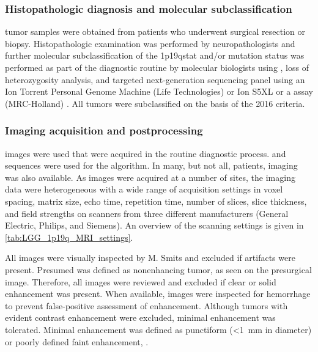 \subsubsection{Histopathologic diagnosis and molecular subclassification}

\Gls{tumor} samples were obtained from patients who underwent surgical resection or biopsy.
Histopathologic examination was performed by neuropathologists and further molecular subclassification of the \acl{1p19qstat} and/or  mutation status was performed as part of the diagnostic routine by molecular biologists using , loss of heterozygosity analysis, and targeted next-generation sequencing panel using an Ion Torrent Personal Genome Machine (Life Technologies) or Ion S5XL or a  assay (MRC-Holland) \autocite{dubbink2015molecular, dubbink2016diagnostic, riemenschneider2010molecular, bienkowski2018molecular}.
All \glspl{tumor} were subclassified on the basis of the  2016 criteria.

\subsubsection{Imaging acquisition and postprocessing}

 images were used that were acquired in the routine diagnostic process.
 and   sequences were used for the algorithm.
In many, but not all, patients,  imaging was also available.
As images were acquired at a number of sites, the imaging data were heterogeneous with a wide range of acquisition settings in voxel spacing, matrix size, echo time, repetition time, number of slices, slice thickness, and field strengths on scanners from three different manufacturers (General Electric, Philips, and Siemens).
An overview of the scanning settings is given in \cref{tab:LGG_1p19q_MRI_settings}.

All images were visually inspected by M. Smits and excluded if  artifacts were present.
Presumed  was defined as nonenhancing \gls{tumor}, as seen on the presurgical   image.
Therefore, all  images were reviewed and excluded if clear or solid enhancement was present.
When available,  images were inspected for hemorrhage to prevent false-positive assessment of enhancement.
Although \glspl{tumor} with evident contrast enhancement were excluded, minimal enhancement was tolerated.
Minimal enhancement was defined as punctiform (\SI{<1}{\milli\meter} in diameter) or poorly defined faint enhancement, .


